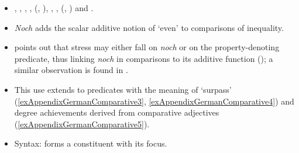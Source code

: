 \label{appendixGermanComparisons}
\largerpage
\begin{itemize}
	\item	\textcite[s.v. \textit{noch}]{DWDS}, \textcite[s.v. \textit{noch}]{Duden}, \textcite[187]{Helbig1994}, \textcite{Klein2018}, \citeauthor{Koenig1977} (\citeyear{Koenig1977}, \citeyear[145]{Koenig1991}), \textcite[174]{KoenigEtAl1993}, \textcite[631–633]{MetrichFaucher2009}, \citeauthor{Umbach2009} (\citeyear{Umbach2009}, \citeyear{Umbach2012}) and \textcite{Shetter1966}.
	\item \textit{Noch} adds the scalar additive notion of \lq even\rq{ }to comparisons of inequality.
	\item  \textcite{Umbach2009} points out that stress may either fall on \textit{noch} or on the property-denoting predicate, thus linking \textit{noch} in comparisons to its additive function (); a similar observation is found in \textcite[631]{MetrichFaucher2009}.
\item This use extends to predicates with the meaning of \lq surpass' (\ref{exAppendixGermanComparative3}, \ref{exAppendixGermanComparative4}) and degree achievements derived from comparative adjectives (\ref{exAppendixGermanComparative5}).
\item Syntax: forms a constituent with its focus.
\end{itemize}
\largerpage
